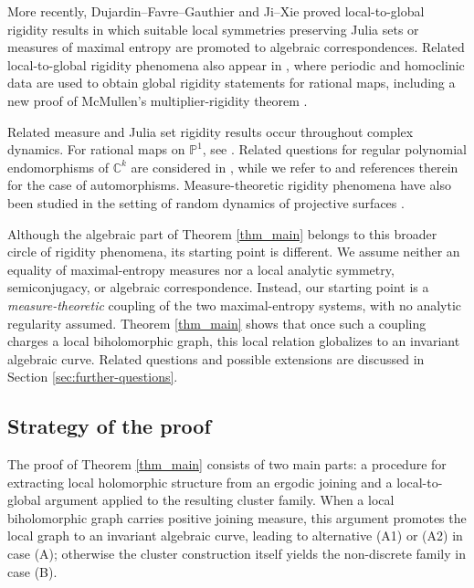 \documentclass[11pt]{amsart}
\numberwithin{equation}{section}
\theoremstyle{plain}
\theoremstyle{definition}
\theoremstyle{remark}
\begin{document}
More recently, Dujardin--Favre--Gauthier \cite{DFG23} and Ji--Xie \cite{JiXieLocalRigidityJuliaSets} proved
local-to-global rigidity results in
which suitable local symmetries preserving Julia sets or measures of
maximal entropy are promoted to algebraic correspondences. 
Related
local-to-global rigidity phenomena also appear in 
\cite{JiXieHomoclinic}, where periodic and homoclinic data are used to obtain global
rigidity statements for rational maps, including a new proof of
McMullen's multiplier-rigidity theorem \cite{McMullen1987}.

Related measure and Julia set rigidity results occur throughout complex dynamics.
For
rational maps on $\mathbb P^1$, see
\cite{LevinPrzytycki1997,Ye15,PakovichMaxCritical}. Related questions
for 
regular polynomial endomorphisms of $\mathbb C^k$ are considered in
\cite{Ueno10,ZhangMeasureRigidity}, while we refer to
\cite{Lamy01,DujFav17,Vigny26} and
references therein for the case of automorphisms.
Measure-theoretic rigidity phenomena have also been studied in the setting of 
random dynamics of projective surfaces \cite{CantatDujardinRandom}.

Although the algebraic part of Theorem \ref{thm_main} belongs to this
broader circle of rigidity phenomena, its starting point is different.
We assume neither an equality of maximal-entropy measures nor a local
analytic symmetry, semiconjugacy, or algebraic correspondence.
Instead, our starting point is a {\it measure-theoretic} coupling of the
two maximal-entropy systems, with no analytic regularity assumed.
Theorem \ref{thm_main} 
shows that once such a coupling charges a local
biholomorphic graph, this local relation globalizes to an invariant
algebraic curve. Related questions and possible extensions are discussed
in Section \ref{sec:further-questions}. 


\subsection{Strategy of the proof}
The proof of Theorem \ref{thm_main} consists of two main parts: a
procedure for extracting local holomorphic structure from an ergodic
joining and a local-to-global argument applied to the resulting
cluster family. When a local biholomorphic graph carries positive
joining measure, this argument promotes the local graph to an
invariant algebraic curve, leading to alternative \textup{(A1)} or
\textup{(A2)} in case \textup{(A)}; otherwise the cluster
construction itself yields the non-discrete family in case
\textup{(B)}.
\end{document}
